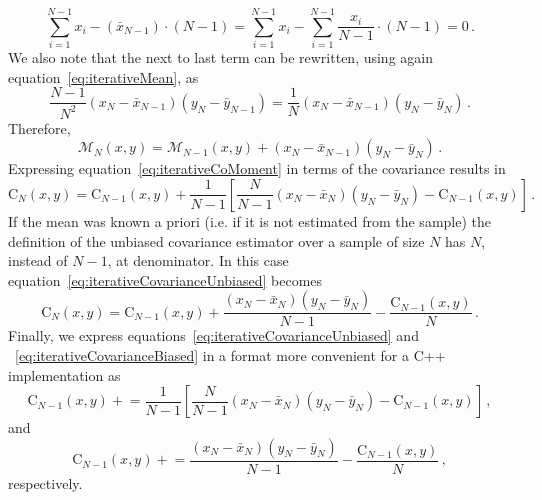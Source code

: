 \documentclass[10pt,a4paper]{report}
\begin{document}
\begin{equation}
\sum\limits_{i=1}^{N-1}x_i - (\bar{x}_{N-1})\cdot(N-1) = \sum\limits_{i=1}^{N-1}x_i - \sum\limits_{i=1}^{N-1}\frac{x_i}{N-1}\cdot(N-1) = 0 \, .
\end{equation}
We also note that the next to last term can be rewritten, using again equation~\ref{eq:iterativeMean}, as
\begin{equation}
\frac{N-1}{N^2}(x_N - \bar{x}_{N-1})(y_N - \bar{y}_{N-1}) = \frac1N(x_N - \bar{x}_{N-1})(y_N - \bar{y}_N)\, .
\end{equation}
Therefore,
\begin{equation}
\mathcal{M}_N(x,y) = \mathcal{M}_{N-1}(x,y) + (x_N - \bar{x}_{N-1})(y_N - \bar{y}_N) \, .
\label{eq:iterativeCoMoment}
\end{equation}
Expressing equation~\ref{eq:iterativeCoMoment} in terms of the covariance results in
\begin{equation}
\mbox{C}_N(x,y) = \mbox{C}_{N-1}(x,y) + \frac{1}{N-1}\left[\frac{N}{N-1}(x_N - \bar{x}_N)(y_N - \bar{y}_N) - \mbox{C}_{N-1}(x,y)\right] \, .
\label{eq:iterativeCovarianceUnbiased}
\end{equation}
If the mean was known a priori (i.e. if it is not estimated from the sample) the definition of the unbiased covariance estimator over a sample of size $N$ has $N$, instead of $N-1$, at denominator. In this case equation~\ref{eq:iterativeCovarianceUnbiased} becomes
\begin{equation}
\mbox{C}_N(x,y) = \mbox{C}_{N-1}(x,y) + \frac{(x_N - \bar{x}_N)(y_N - \bar{y}_N)}{N-1} - \frac{\mbox{C}_{N-1}(x,y)}{N} \, .
\label{eq:iterativeCovarianceBiased}
\end{equation}
Finally, we express equations~\ref{eq:iterativeCovarianceUnbiased} and ~\ref{eq:iterativeCovarianceBiased} in a format more convenient for a C++ implementation as
\begin{equation}
\mbox{C}_{N-1}(x,y) \mathrel{+}= \frac{1}{N-1}\left[\frac{N}{N-1}(x_N - \bar{x}_N)(y_N - \bar{y}_N) - \mbox{C}_{N-1}(x,y)\right] \, ,
\end{equation}
and
\begin{equation}
\mbox{C}_{N-1}(x,y) \mathrel{+}= \frac{(x_N - \bar{x}_N)(y_N - \bar{y}_N)}{N-1} - \frac{\mbox{C}_{N-1}(x,y)}{N} \, ,
\end{equation}
respectively.

{}

\end{document}
